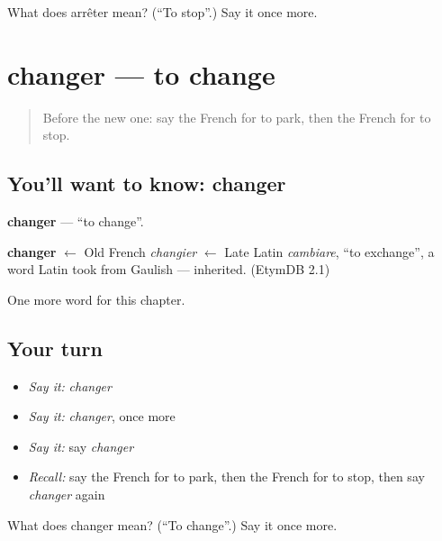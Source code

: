 \begin{tcolorbox}[breakable,colback=teal!4,colframe=teal!35!black,title={Before you move on}]
What does arrêter mean? (\textquotedblleft{}To stop\textquotedblright{}.) Say it once more.
\end{tcolorbox}
\section[changer]{changer — to change}

\label{lesson:FR-C176-changer}



\begin{quote}
Before the new one: say the French for to park, then the French for to stop.
\end{quote}

\subsection*{You'll want to know: changer}
\textbf{changer} — \textquotedblleft{}to change\textquotedblright{}.

\begin{cousinweb}
\textbf{changer} $\leftarrow$ Old French \emph{changier} $\leftarrow$ Late Latin \emph{cambiare}, \textquotedblleft{}to exchange\textquotedblright{}, a word Latin took from Gaulish — inherited. (EtymDB 2.1)
\end{cousinweb}

\begin{grammarlens}[title={What you've built}]
One more word for this chapter.
\end{grammarlens}

\subsection*{Your turn}
\begin{itemize}
\raggedright
  \item \emph{Say it:} \emph{changer}
  \item \emph{Say it:} \emph{changer}, once more
  \item \emph{Say it:} say \emph{changer}
  \item \emph{Recall:} say the French for to park, then the French for to stop, then say \emph{changer} again
\end{itemize}

\begin{tcolorbox}[breakable,colback=teal!4,colframe=teal!35!black,title={Before you move on}]
What does changer mean? (\textquotedblleft{}To change\textquotedblright{}.) Say it once more.
\end{tcolorbox}
